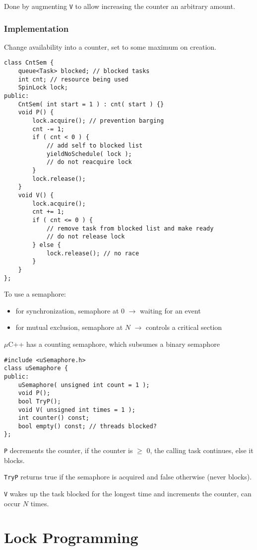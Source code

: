 \documentclass[11pt]{article}
\begin{document}
Done by augmenting \texttt{V} to allow increasing the counter an arbitrary amount.
\subsubsection{Implementation}
\label{sec:orgdff726f}
Change availability into a counter, set to some maximum on creation.

\begin{verbatim}
class CntSem {
    queue<Task> blocked; // blocked tasks
    int cnt; // resource being used
    SpinLock lock;
public:
    CntSem( int start = 1 ) : cnt( start ) {}
    void P() {
        lock.acquire(); // prevention barging
        cnt -= 1;
        if ( cnt < 0 ) {
            // add self to blocked list
            yieldNoSchedule( lock );
            // do not reacquire lock
        }
        lock.release();
    }
    void V() {
        lock.acquire();
        cnt += 1;
        if ( cnt <= 0 ) {
            // remove task from blocked list and make ready
            // do not release lock
        } else {
            lock.release(); // no race
        }
    }
};
\end{verbatim}

To use a semaphore:
\begin{itemize}
\item for synchronization, semaphore at 0 \(\to\) waiting for an event
\item for mutual exclusion, semaphore at \(N\) \(\to\) controls a critical section
\end{itemize}

\(\mu\)C++ has a counting semaphore, which subsumes a binary semaphore
\begin{verbatim}
#include <uSemaphore.h>
class uSemaphore {
public:
    uSemaphore( unsigned int count = 1 );
    void P();
    bool TryP();
    void V( unsigned int times = 1 );
    int counter() const;
    bool empty() const; // threads blocked?
};
\end{verbatim}

\texttt{P} decrements the counter, if the counter is \(\ge\) 0, the calling task continues, else it blocks.

\texttt{TryP} returns true if the semaphore is acquired and false otherwise (never blocks).

\texttt{V} wakes up the task blocked for the longest time and increments the counter, can occur \(N\) times.
\section{Lock Programming}
\label{sec:org3d35094}
\end{document}
